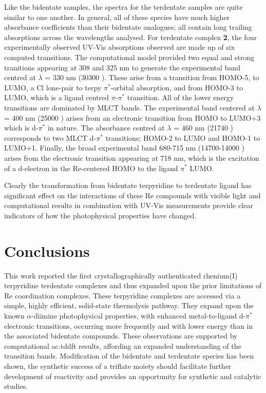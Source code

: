 Like the bidentate samples, the spectra for the terdentate samples are quite similar to one another. In general, all of these species have much higher absorbance coefficients than their bidentate analogues; all contain long trailing absorptions across the wavelengths analysed. For terdentate complex \textbf{2}, the four experimentally observed UV-Vis absorptions observed are made up of six computed transitions. The computational model provided two equal and strong tranitions appearing at 308 and 325 nm to generate the experimental band centred at $\lambda$ = 330 nm (30300 ). These arise from a transition from HOMO-5, to LUMO, a Cl lone-pair to terpy $\pi^\ast$-orbital absorption, and from HOMO-3 to LUMO, which is a ligand centred $\pi$-$\pi^\ast$ transition. All of the lower energy transitions are dominated by MLCT bands. The experimental band centered at $\lambda$ = 400 nm (25000 ) arises from an electronic transition from HOMO to LUMO+3 which is d-$\pi^\ast$ in nature. The absorbance centred at $\lambda$ = 460 nm (21740 ) corresponds to two MLCT d-$\pi^\ast$ transitions; HOMO-2 to LUMO and HOMO-1 to LUMO+1. Finally, the broad experimental band 680-715 nm (14700-14000 ) arises from the electronic transition appearing at 718 nm, which is the excitation of a d-electron in the Re-centered HOMO to the ligand $\pi^\ast$ LUMO. 

Clearly the transformation from bidentate terpyridine to terdentate ligand has significant effect on the interactions of these Re compounds with visible light and computational results in combination with UV-Vis measurements provide clear indicators of how the photophysical properties have changed.

\section{Conclusions}

This work reported the first crystallographically authenticated rhenium(I) terpyridine terdentate complexes and thus expanded upon the prior limitations of Re coordination complexes. These terpyridine complexes are accessed via a simple, highly efficient, solid-state thermolysis pathway. They expand upon the known $\alpha$-diimine photophysical properties, with enhanced metal-to-ligand d-$\pi^\ast$ electronic transitions, occurring more frequently and with lower energy than in the associated bidentate compounds. These observations are supported by computational \gls{ac.tddft} results, affording an expanded understanding of the transition bands. Modification of the bidentate and terdentate species has been shown, the synthetic success of a triflate moiety should facilitate further development of reactivity and provides an opportunity for synthetic and catalytic studies.



